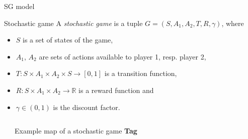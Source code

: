 \documentclass{beamer}
\newcommand\unit{0.75}
\newcommand\zero{0}
\newcommand\one{\unit}
\newcommand\two{2 * \unit}
\begin{document}
\begin{frame}{SG model}
    \begin{block}{Stochastic game}
        A \textit{stochastic game} is a tuple $G = \left(S, A_1, A_2, T, R, \gamma\right)$, where
        \begin{itemize}
            \item $S$ is a set of states of the game,
            \item $A_1$, $A_2$ are sets of actions available to player 1, resp. player 2,
            \item $T: S \times A_1 \times A_2 \times S \to \left[0, 1\right]$ is a transition function,
            \item $R: S \times A_1 \times A_2 \to \mathbb{R}$ is a reward function and
            \item $\gamma \in \left(0, 1\right)$ is the discount factor.
        \end{itemize}
    \end{block}
    \begin{columns}
        \begin{flushright}
        \end{flushright}
        \begin{flushleft}
            Example map of a stochastic game \textbf{Tag}
        \end{flushleft}
    \end{columns}
\end{frame}
\end{document}
